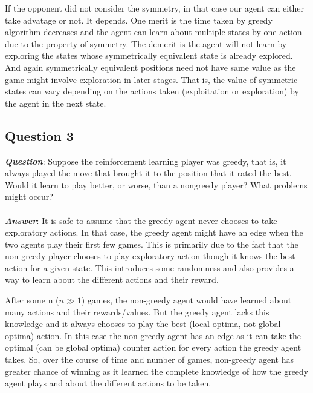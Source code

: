 \documentclass[a4paper,10pt]{report}
\begin{document}
If the opponent did not consider the symmetry, in that case our agent can either take advatage or not. It depends. One merit is the time taken by greedy algorithm decreases and the agent can learn about multiple states by one action due to the property of symmetry. The demerit is the agent will not learn by exploring the states whose symmetrically equivalent state is already explored. And again symmetrically equivalent positions need not have same value as the game might involve exploration in later stages. That is, the value of symmetric states can vary depending on the actions taken (exploitation or exploration) by the agent in the next state.
\pagebreak
\subsection{Question 3}
\textbf{\emph{Question}}: Suppose the reinforcement learning player was greedy, that is, it always played the move that brought it to the position that it rated the best. Would it learn to play better, or worse, than a nongreedy player? What problems might occur?
\\\\
\textbf{\emph{Answer}}: It is safe to assume that the greedy agent never chooses to take exploratory actions. In that case, the greedy agent might have an edge when the two agents play their first few games. This is primarily due to the fact that the non-greedy player chooses to play exploratory action though it knows the best action for a given state. This introduces some randomness and also provides a way to learn about the different actions and their reward. 

After some n ($n\gg1$) games, the non-greedy agent would have learned about many actions and their rewards/values. But the greedy agent lacks this knowledge and it always chooses to play the best (local optima, not global optima) action. In this case the non-greedy agent has an edge as it can take the optimal (can be global optima) counter action for every action the greedy agent takes. So, over the course of time and number of games, non-greedy agent has greater chance of winning as it learned the complete knowledge of how the greedy agent plays and about the different actions to be taken.
\end{document}
